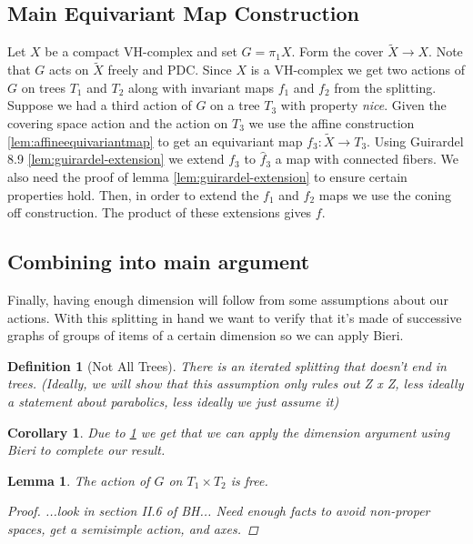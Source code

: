 \documentclass{article}
\theoremstyle{mystyle}
\newtheorem{lem}{Lemma}[section]
\newtheorem{defn}{Definition}
\newtheorem*{cor*}{Corollary}
\theoremstyle{remark}
\begin{document}
\subsection{Main Equivariant Map Construction}
Let \(X\) be a compact VH-complex and set \(G= \pi_{1} X\). Form the cover \(\widetilde{X} \to X\). Note that \(G\) acts on \(\widetilde X\) freely and PDC. Since \(X\) is a VH-complex we get two actions of \(G\) on trees \(T_{1}\) and \(T_{2}\) along with invariant maps \(f_{1}\) and \(f_{2}\) from the splitting. Suppose we had a third action of \(G\) on a tree \(T_{3}\) with property {\em nice}. Given the covering space action and the action on \(T_{3}\) we use the affine construction \ref{lem:affineequivariantmap} to get an equivariant map \(f_{3} : \widetilde X \to T_{3}\). Using Guirardel 8.9 \ref{lem:guirardel-extension} we extend \(f_{3}\) to \(\widehat f_{3}\) a map with connected fibers. We also need the proof of lemma \ref{lem:guirardel-extension} to ensure certain properties hold. Then, in order to extend the \(f_{1}\) and \(f_{2}\) maps we use the coning off construction. The product of these extensions gives \(f\).
    


\subsection{Combining into main argument}

Finally, having enough dimension will follow from some assumptions about our actions.
With this splitting in hand we want to verify that it's made of successive graphs of groups of items of a certain dimension so we can apply Bieri.

\begin{defn}
    [Not All Trees]
    \label{def:notalltrees} 
    There is an iterated splitting that doesn't end in trees. (Ideally, we will show that this assumption only rules out Z x Z, less ideally a statement about parabolics, less ideally we just assume it)
\end{defn}

\begin{cor*}
    Due to \ref{def:notalltrees} we get that we can apply the dimension argument using Bieri to complete our result.
\end{cor*}


\begin{lem}
    The action of \(G\) on \(T_1 \times T_{2} \) is free.
    \begin{proof}
        ...look in section II.6 of BH... Need enough facts to avoid non-proper spaces, get a semisimple action, and axes.
    \end{proof}
\end{lem}
\end{document}

